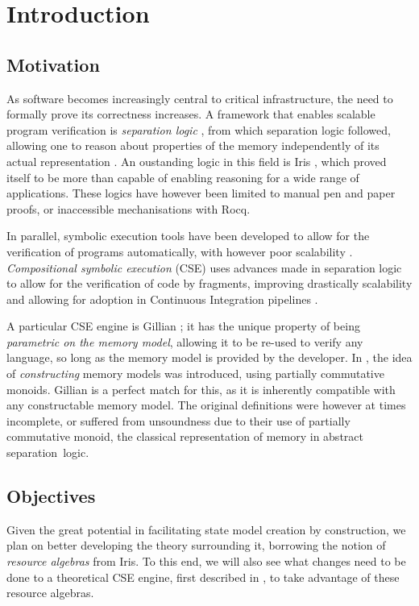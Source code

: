 \chapter{Introduction}

\section{Motivation}

As software becomes increasingly central to critical infrastructure, the need to formally prove its correctness increases. A framework that enables scalable program verification is \emph{separation logic} \cite{seplogic1,seplogic2}, from which  separation logic followed, allowing one to reason about properties of the memory independently of its actual representation \cite{higherorderseplogic,abstractseplogic}. An oustanding logic in this field is Iris \cite{iris}, which proved itself to be more than capable of enabling reasoning for a wide range of applications. These logics have however been limited to manual pen and paper proofs, or inaccessible mechanisations with Rocq.

In parallel, symbolic execution tools have been developed to allow for the verification of programs automatically, with however poor scalability \cite{pathexplo}. \emph{Compositional symbolic execution} (CSE) uses advances made in separation logic to allow for the verification of code by fragments, improving drastically scalability and allowing for adoption in Continuous Integration pipelines \cite{pulse}.

A particular CSE engine is Gillian \cite{gillian0}; it has the unique property of being \emph{parametric on the memory model}, allowing it to be re-used to verify any language, so long as the memory model is provided by the developer. In \cite{sacha-phd}, the idea of \emph{constructing} memory models was introduced, using partially commutative monoids. Gillian is a perfect match for this, as it is inherently compatible with any constructable memory model. The original definitions were however at times incomplete, or suffered from unsoundness due to their use of partially commutative monoid, the classical representation of memory in abstract separation~logic.

\section{Objectives}

Given the great potential in facilitating state model creation by construction, we plan on better developing the theory surrounding it, borrowing the notion of \emph{resource algebras} from Iris. To this end, we will also see what changes need to be done to a theoretical CSE engine, first described in \cite{cse1,cse2}, to take advantage of these resource algebras. 

